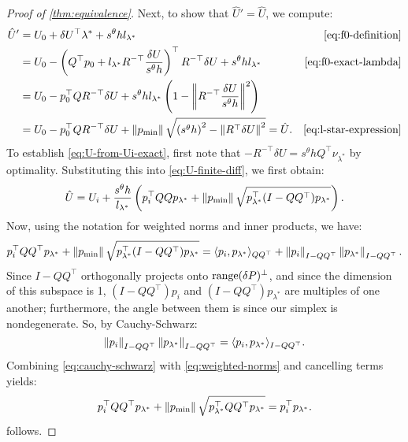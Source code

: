\documentclass[sisc-eikonal.tex]{subfiles}
\begin{document}
\begin{proof}[Proof of \cref{thm:equivalence}]
  Next, to show that $\hat{U}' = \hat{U}$, we compute:
  \begin{align*}
    \hat{U}'
    &= U_0 + \delta U^\top \lambda^* + s^\theta h l_{\lambda^*} & \cref{eq:f0-definition} \\
    &= U_0 - \parens{Q^\top p_0 + l_{\lambda^*} R^{-\top} \frac{\delta U}{s^\theta h}}^\top R^{-\top} \delta U + s^\theta h l_{\lambda^*} & \cref{eq:f0-exact-lambda} \\
    &= U_0 - p_0^\top Q R^{-\top} \delta U + s^\theta h l_{\lambda^*} \parens{1 - \norm{R^{-\top} \frac{\delta U}{s^\theta h}}^2} \\
    &= U_0 - p_0^\top Q R^{-\top} \delta U + \norm{\pmin} \sqrt{\parens{s^\theta h}^2 - \norm{R^\top \delta U}^2} = \hat{U}. & \cref{eq:l-star-expression}
  \end{align*}
  To establish \cref{eq:U-from-Ui-exact}, first note that
  $-R^{-\top} \delta U = s^\theta h Q^\top \nu_{\lambda^*}$ by
  optimality. Substituting this into \cref{eq:U-finite-diff}, we first
  obtain:
  \begin{equation}
    \hat{U} = U_i + \frac{s^\theta h}{l_{\lambda^*}} \left(p_i^\top QQ p_{\lambda^*} + \left\|p_{\operatorname{min}}\right\| \sqrt{p_{\lambda^*}^\top (I - QQ^\top) p_{\lambda^*}}\right).
  \end{equation}
  Now, using the notation for weighted norms and inner products, we have:
  \begin{equation}\label{eq:weighted-norms}
    p_i^\top QQ^\top p_{\lambda^*} + \norm{\pmin} \sqrt{p_{\lambda^*}^\top (I - QQ^\top) p_{\lambda^*}} = \langle p_i, p_{\lambda^*} \rangle_{QQ^\top} + \norm{p_i}_{I - QQ^\top} \norm{p_{\lambda^*}}_{I - QQ^\top}.
  \end{equation}
  Since $I - QQ^\top$ orthogonally projects onto
  $\operatorname{range}(\delta P)^\perp$, and since the dimension of this subspace
  is 1, $(I - QQ^\top) p_i$ and $(I - QQ^\top) p_{\lambda^*}$ are
  multiples of one another; furthermore, the angle between them is
  since our simplex is nondegenerate. So, by Cauchy-Schwarz:
  \begin{equation}\label{eq:cauchy-schwarz}
    \norm{p_i}_{I - QQ^\top} \norm{p_{\lambda^*}}_{I - QQ^\top} = \langle p_i, p_{\lambda^*} \rangle_{I - QQ^\top}.
  \end{equation}
  Combining \cref{eq:cauchy-schwarz} with \cref{eq:weighted-norms} and
  cancelling terms yields:
  \begin{equation}
    p_i^\top QQ^\top p_{\lambda^*} + \left\|p_{\operatorname{min}}\right\| \sqrt{p_{\lambda^*}^\top QQ^\top p_{\lambda^*}} = p_i^\top p_{\lambda^*}.
  \end{equation}
   follows.


\end{proof}
\end{document}
